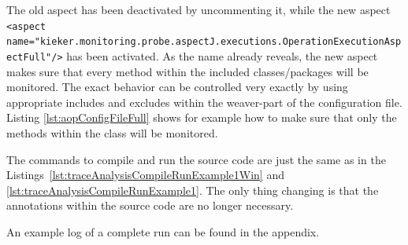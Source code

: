 \setXMLListing


\noindent The old aspect has been deactivated by uncommenting it, while the new aspect \lstinline$<aspect name="kieker.monitoring.probe.aspectJ.executions.OperationExecutionAspectFull"/>$ has been activated. As the name already reveals, the new aspect makes sure that every method within the included classes/packages will be monitored. The exact behavior can be controlled very exactly by using appropriate includes and excludes within the weaver-part of the configuration file. Listing \ref{lst:aopConfigFileFull} shows for example how to make sure that only the methods within the class  will be monitored.

The commands to compile and run the source code are just the same as in the Listings~\ref{lst:traceAnalysisCompileRunExample1Win} and \ref{lst:traceAnalysisCompileRunExample1}. The only thing changing is that the annotations within the source code are no longer necessary.

An example log of a complete run can be found in the appendix.